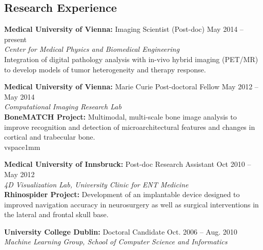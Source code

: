 \documentclass[line,a4paper]{resume}
\begin{document}
\begin{resume}
	\section{\mysidestyle Research Experience}\vspace{3mm}
	\begin{minipage}{\textwidth}
	\textbf{Medical University of Vienna:} Imaging Scientist (Post-doc) \hfill May 2014 -- present \\%
	\textsl{Center for Medical Physics and Biomedical Engineering}\vspace{1mm}\\
	 Integration of digital pathology analysis with in-vivo hybrid imaging (PET/MR) to develop models of tumor heterogeneity and therapy response.\vspace{1mm}\\%
	\end{minipage}
	\begin{minipage}{\textwidth}
	\textbf{Medical University of Vienna:} Marie Curie Post-doctoral Fellow \hfill May 2012 -- May 2014 \\%
	\textsl{Computational Imaging Research Lab}\vspace{1mm}\\
	  \textbf{BoneMATCH Project:} Multimodal, multi-scale bone image analysis to improve recognition and detection of microarchitectural features and changes in cortical and trabecular bone.\\vspace{1mm}\\%
	\end{minipage}
	\begin{minipage}{\textwidth}
	\textbf{Medical University of Innsbruck:} Post-doc Research Assistant \hfill Oct 2010 -- May 2012 \\%
	\textsl{4D Visualization Lab, University Clinic for ENT Medicine}\vspace{1mm}\\
	  \textbf{Rhinospider Project:} Development of an implantable device designed to improved navigation accuracy in neurosurgery as well as surgical interventions in the lateral and frontal skull base. \vspace{1mm}\\%
	\end{minipage}
	\begin{minipage}{\textwidth}
	\textbf{University College Dublin:} Doctoral Candidate \hfill Oct. 2006 -- Aug. 2010 \\%
	\textsl{Machine Learning Group, School of Computer Science and Informatics}\vspace{1mm}\\

\end{minipage}
\end{resume}
\end{document}
